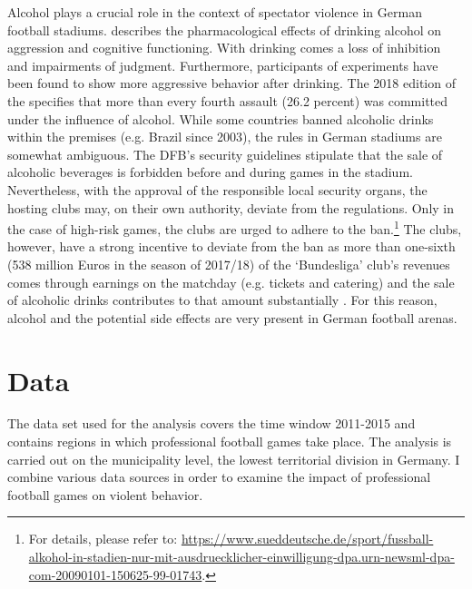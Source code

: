 Alcohol plays a crucial role in the context of spectator violence in German football stadiums. \cite{cook2013virtuous} describes the pharmacological effects of drinking alcohol on aggression and cognitive functioning. With drinking comes a loss of inhibition and impairments of judgment. Furthermore, participants of experiments have been found to show more aggressive behavior after drinking. The 2018 edition of the \citeauthor{PCS2018} specifies that more than every fourth assault (26.2 percent) was committed under the influence of alcohol. While some countries banned alcoholic drinks within the premises (e.g. Brazil since 2003), the rules in German stadiums are somewhat ambiguous. The DFB's security guidelines stipulate that the sale of alcoholic beverages is forbidden before and during games in the stadium. Nevertheless, with the approval of the responsible local security organs, the hosting clubs may, on their own authority, deviate from the regulations. Only in the case of high-risk games, the clubs are urged to adhere to the ban.\footnote{For details, please refer to: \href{https://www.sueddeutsche.de/sport/fussball-alkohol-in-stadien-nur-mit-ausdruecklicher-einwilligung-dpa.urn-newsml-dpa-com-20090101-150625-99-01743}{https://www.sueddeutsche.de/sport/fussball-alkohol-in-stadien-nur-mit-ausdruecklicher-einwilligung-dpa.urn-newsml-dpa-com-20090101-150625-99-01743}.} The clubs, however, have a strong incentive to deviate from the ban as more than one-sixth (538 million Euros in the season of 2017/18) of the `Bundesliga' club's revenues comes through earnings on the matchday (e.g. tickets and catering) and the sale of alcoholic drinks contributes to that amount substantially \citep{deloitte2019report}. For this reason, alcohol and the potential side effects are very present in German football arenas.





\bigskip
\section{Data}\label{sec_soc_ext:data} 
The data set used for the analysis covers the time window 2011-2015 and contains regions in which professional football games take place. The analysis is carried out on the municipality level, the lowest territorial division in Germany. I combine various data sources in order to examine the impact of professional football games on violent behavior.



